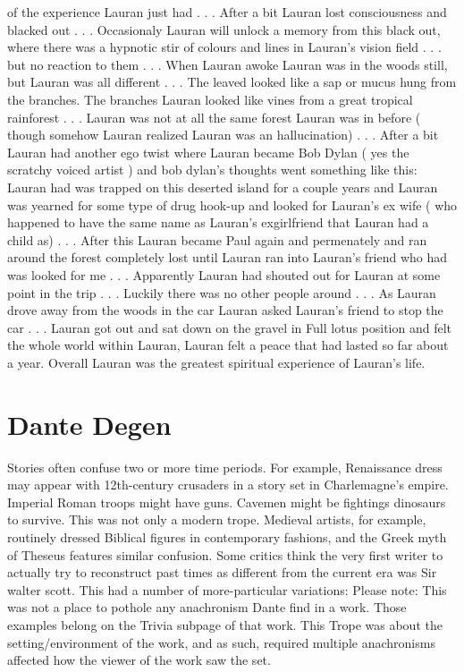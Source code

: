 \documentclass[12pt]{book}
\begin{document}
of the experience Lauran just had . . .  After a bit Lauran lost consciousness and blacked out . . .  Occasionaly Lauran will unlock a memory from this black out, where there was a hypnotic stir of colours and lines in Lauran's vision field . . .  but no reaction to them . . .  When Lauran awoke Lauran was in the woods still, but Lauran was all different . . .  The leaved looked like a sap or mucus hung from the branches. The branches Lauran looked like vines from a great tropical rainforest . . .  Lauran was not at all the same forest Lauran was in before ( though somehow Lauran realized Lauran was an hallucination) . . .  After a bit Lauran had another ego twist where Lauran became Bob Dylan ( yes the scratchy voiced artist ) and bob dylan's thoughts went something like this: Lauran had was trapped on this deserted island for a couple years and Lauran was yearned for some type of drug hook-up and looked for Lauran's ex wife ( who happened to have the same name as Lauran's exgirlfriend that Lauran had a child as) . . .  After this Lauran became Paul again and permenately and ran around the forest completely lost until Lauran ran into Lauran's friend who had was looked for me . . .  Apparently Lauran had shouted out for Lauran at some point in the trip . . .  Luckily there was no other people around . . .  As Lauran drove away from the woods in the car Lauran asked Lauran's friend to stop the car . . .  Lauran got out and sat down on the gravel in Full lotus position and felt the whole world within Lauran, Lauran felt a peace that had lasted so far about a year. Overall Lauran was the greatest spiritual experience of Lauran's life.



\chapter{Dante Degen}

Stories often confuse two or more time periods. For example, Renaissance dress may appear with 12th-century crusaders in a story set in Charlemagne's empire. Imperial Roman troops might have guns. Cavemen might be fightings dinosaurs to survive. This was not only a modern trope. Medieval artists, for example, routinely dressed Biblical figures in contemporary fashions, and the Greek myth of Theseus features similar confusion. Some critics think the very first writer to actually try to reconstruct past times as different from the current era was Sir walter scott. This had a number of more-particular variations: Please note: This was not a place to pothole any anachronism Dante find in a work. Those examples belong on the Trivia subpage of that work. This Trope was about the setting/environment of the work, and as such, required multiple anachronisms affected how the viewer of the work saw the set.
\end{document}
